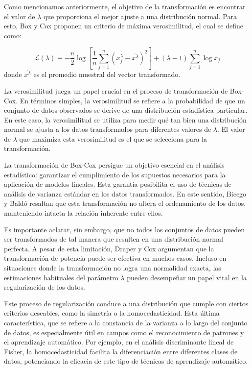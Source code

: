     Como mencionamos anteriormente, el objetivo de la transformaci\'on es encontrar el valor de $\lambda$ que proporciona el mejor ajuste a una distribuci\'on normal. Para esto, Box y Cox proponen un criterio de m\'axima verosimilitud, el cual se define como:

    \begin{equation}
        \mathcal{L}(\lambda) \equiv-\frac{n}{2} \log \left[\frac{1}{n} \sum_{j=1}^{n}\left(x_{j}^{\lambda}-\overline{x^{\lambda}}\right)^{2}\right] +(\lambda-1) \sum_{j=1}^{n} \log x_{j}
    \end{equation}
    donde $\overline{x^{\lambda}}$ es el promedio muestral del vector transformado.

    La verosimilitud juega un papel crucial en el proceso de transformaci\'on de Box-Cox. En t\'erminos simples, la verosimilitud se refiere a la probabilidad de que un conjunto de datos observados se derive de una distribuci\'on estad\'istica particular. En este caso, la verosimilitud se utiliza para medir qu\'e tan bien una distribuci\'on normal se ajusta a los datos transformados para diferentes valores de $\lambda$. El valor de $\lambda$ que maximiza esta verosimilitud es el que se selecciona para la transformaci\'on.

    
    La transformaci\'on de Box-Cox persigue un objetivo esencial en el an\'alisis estad\'istico: garantizar el cumplimiento de los supuestos necesarios para la aplicaci\'on de modelos lineales. Esta garant\'ia posibilita el uso de t\'ecnicas de an\'alisis de varianza est\'andar en los datos transformados. En este sentido, Bicego y Bald\'o \cite{bicego2016} resaltan que esta transformaci\'on no altera el ordenamiento de los datos, manteniendo intacta la relaci\'on inherente entre ellos.

    Es importante aclarar, sin embargo, que no todos los conjuntos de datos pueden ser transformados de tal manera que resulten en una distribuci\'on normal perfecta. A pesar de esta limitaci\'on, Draper y Cox \cite{draper1969}argumentan que la transformaci\'on de potencia puede ser efectiva en muchos casos. Incluso en situaciones donde la transformaci\'on no logra una normalidad exacta, las estimaciones habituales del par\'ametro $\lambda$ pueden desempe\~nar un papel vital en la regularizaci\'on de los datos.

    Este proceso de regularizaci\'on conduce a una distribuci\'on que cumple con ciertos criterios deseables, como la simetr\'ia o la homocedasticidad. Esta \'ultima caracter\'istica, que se refiere a la constancia de la varianza a lo largo del conjunto de datos, es especialmente \'util en campos como el reconocimiento de patrones y el aprendizaje autom\'atico. Por ejemplo, en el an\'alisis discriminante lineal de Fisher, la homocedasticidad facilita la diferenciaci\'on entre diferentes clases de datos, potenciando la eficacia de este tipo de t\'ecnicas de aprendizaje autom\'atico.


